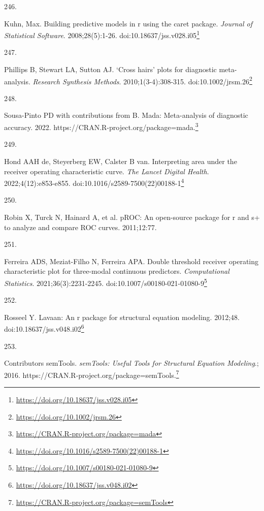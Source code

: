 \documentclass[
  a4paper,
]{book}
\newlength{\cslhangindent}
\newlength{\csllabelwidth}
\newlength{\cslentryspacingunit} %
\newenvironment{CSLReferences}[2] %
 {%
  \setlength{\parindent}{0pt}
  \ifodd #1
  \let\oldpar\par
  \def\par{\hangindent=\cslhangindent\oldpar}
  \fi
  \setlength{\parskip}{#2\cslentryspacingunit}
 }%
 {}
\newcommand{\CSLLeftMargin}[1]{\parbox[t]{\csllabelwidth}{#1}}
\newcommand{\CSLRightInline}[1]{\parbox[t]{\linewidth - \csllabelwidth}{#1}\break}
\renewcommand{\href}[2]{#2\footnote{\url{#1}}}
\begin{document}
\begin{CSLReferences}{0}{0}
\leavevmode{}%
\CSLLeftMargin{246. }%
\CSLRightInline{Kuhn, Max. Building predictive models in r using the caret package. \emph{Journal of Statistical Software}. 2008;28(5):1-26. doi:\href{https://doi.org/10.18637/jss.v028.i05}{10.18637/jss.v028.i05}}

\leavevmode{}%
\CSLLeftMargin{247. }%
\CSLRightInline{Phillips B, Stewart LA, Sutton AJ. {`}Cross hairs{'} plots for diagnostic meta{-}analysis. \emph{Research Synthesis Methods}. 2010;1(3-4):308-315. doi:\href{https://doi.org/10.1002/jrsm.26}{10.1002/jrsm.26}}

\leavevmode{}%
\CSLLeftMargin{248. }%
\CSLRightInline{Sousa-Pinto PD with contributions from B. Mada: Meta-analysis of diagnostic accuracy. 2022. \href{https://CRAN.R-project.org/package=mada}{https://CRAN.R-project.org/package=mada.}}

\leavevmode{}%
\CSLLeftMargin{249. }%
\CSLRightInline{Hond AAH de, Steyerberg EW, Calster B van. Interpreting area under the receiver operating characteristic curve. \emph{The Lancet Digital Health}. 2022;4(12):e853-e855. doi:\href{https://doi.org/10.1016/s2589-7500(22)00188-1}{10.1016/s2589-7500(22)00188-1}}

\leavevmode{}%
\CSLLeftMargin{250. }%
\CSLRightInline{Robin X, Turck N, Hainard A, et al. pROC: An open-source package for r and s+ to analyze and compare ROC curves. 2011;12:77.}

\leavevmode{}%
\CSLLeftMargin{251. }%
\CSLRightInline{Ferreira ADS, Meziat-Filho N, Ferreira APA. Double threshold receiver operating characteristic plot for three-modal continuous predictors. \emph{Computational Statistics}. 2021;36(3):2231-2245. doi:\href{https://doi.org/10.1007/s00180-021-01080-9}{10.1007/s00180-021-01080-9}}

\leavevmode{}%
\CSLLeftMargin{252. }%
\CSLRightInline{Rosseel Y. {\textbraceleft}Lavaan{\textbraceright}: An {\textbraceleft}r{\textbraceright} package for structural equation modeling. 2012;48. doi:\href{https://doi.org/10.18637/jss.v048.i02}{10.18637/jss.v048.i02}}

\leavevmode{}%
\CSLLeftMargin{253. }%
\CSLRightInline{Contributors semTools. \emph{{semTools}: Useful Tools for Structural Equation Modeling}.; 2016. \href{https://CRAN.R-project.org/package=semTools}{https://CRAN.R-project.org/package=semTools.}}


\end{CSLReferences}
\end{document}
